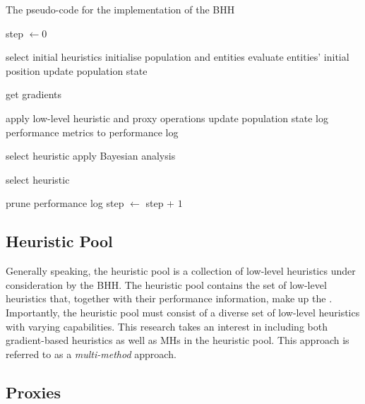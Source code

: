 \documentclass[preprint,review,12pt]{elsarticle}
\begin{document}
\begin{algorithm}[htbp]
	\footnotesize
	\caption{The pseudo-code for the implementation of the \acf{BHH}}
	\label{algo:bhh}
	\begin{algorithmic}
		\State step $\gets 0$

		\State select initial heuristics
		\State initialise population and entities
		\State evaluate entities' initial position
		\State update population state

		\State get gradients
		\EndIf

		\State apply low-level heuristic and proxy operations
		\State update population state
		\State log performance metrics to performance log

		\State select heuristic
		\Else
		\State apply Bayesian analysis
		\EndIf

		\State select heuristic
		\EndIf

		\State prune performance log
		\EndIf
		\EndIf
		\EndFor
		\State step $\gets$ step + $1$
		\EndWhile
	\end{algorithmic}
\end{algorithm}

\subsection{Heuristic Pool}\label{sec:bhh:heuristic_pool}

Generally speaking, the heuristic pool is a collection of low-level heuristics under consideration by the \acs{BHH}. The heuristic pool contains the set of low-level heuristics that, together with their performance information, make up the . Importantly, the heuristic pool must consist of a diverse set of low-level heuristics with varying capabilities. This research takes an interest in including both gradient-based heuristics as well as \acp{MH} in the heuristic pool. This approach is referred to as a \textit{multi-method} approach.

\subsection{Proxies}\label{sec:bhh:heuristic:proxies}
\end{document}
